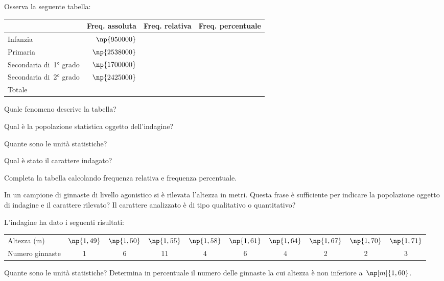 \begin{esercizio}
\label{ese:A.7}
Osserva la seguente tabella:
 \begin{center}
 \begin{tabularx}{.85\textwidth}{lrcc}
\toprule
 & Freq. assoluta & Freq. relativa & Freq. percentuale \\
\midrule
Infanzia & $\np{950000}$ & & \\
Primaria & $\np{2538000}$ & & \\
Secondaria di~1° grado & $\np{1700000}$ & & \\
Secondaria di~2° grado & $\np{2425000}$ & & \\
Totale & & & \\
\bottomrule
\end{tabularx}
 \end{center}
\begin{itemize*}
\item Quale fenomeno descrive la tabella?
\item Qual è la popolazione statistica oggetto dell'indagine?
\item Quante sono le unità statistiche?
\item Qual è stato il carattere indagato?
\item Completa la tabella calcolando frequenza relativa e frequenza percentuale.
\end{itemize*}
\end{esercizio}

\begin{esercizio}
\label{ese:A.8}
In un campione di ginnaste di livello agonistico si è rilevata l'altezza in metri. Questa frase è sufficiente per indicare la popolazione oggetto
di indagine e il carattere rilevato? Il carattere analizzato è di tipo qualitativo o quantitativo?

L'indagine ha dato i seguenti risultati:
\begin{center}
 \begin{tabular}{lccccccccc}
\toprule
Altezza (m) & $\np{1,49}$ & $\np{1,50}$ & $\np{1,55}$ & $\np{1,58}$ & $\np{1,61}$ & $\np{1,64}$ & $\np{1,67}$ & $\np{1,70}$ & $\np{1,71}$ \\
Numero ginnaste & 1 & 6 & 11 & 4 & 6 & 4 & 2 & 2 & 3 \\
\bottomrule
\end{tabular}
\end{center}
Quante sono le unità statistiche? Determina in percentuale il numero delle ginnaste la cui altezza è non inferiore a~$\np[m]{1,60}$.
\end{esercizio}


